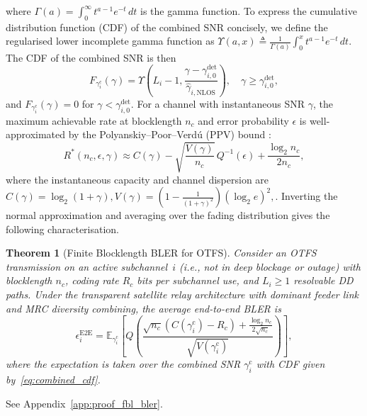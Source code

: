 \documentclass[lettersize,journal]{IEEEtran}
\newtheorem{theorem}{Theorem}
\begin{document}
where $\Gamma(a) = \int_0^{\infty} t^{a-1} e^{-t}\,dt$ is the gamma 
function. To express the cumulative distribution function (CDF) of the combined SNR concisely, we define the regularised lower incomplete gamma function as $
\Upsilon(a,x) \triangleq \frac{1}{\Gamma(a)}\int_0^x t^{a-1} e^{-t} \, dt.
$ The CDF of the combined SNR is then
\begin{equation}
F_{\gamma_i^{\mathrm{c}}}(\gamma) = \Upsilon\left(L_i-1, \frac{\gamma - \gamma_{i,0}^{\mathrm{det}}}{\hat{\gamma}_{i,\mathrm{NLOS}}}\right), \quad \gamma \geq \gamma_{i,0}^{\mathrm{det}},
\label{eq:combined_cdf}
\end{equation}
and $F_{\gamma_i^{\mathrm{c}}}(\gamma) = 0$ for $\gamma < \gamma_{i,0}^{\mathrm{det}}$. For a channel with instantaneous SNR $\gamma$, the maximum achievable rate at blocklength $n_c$ and error probability $\epsilon$ is well-approximated by the Polyanskiy--Poor--Verd\'{u} (PPV) bound \cite{7303958,Yang2014}:
\begin{equation}
R^*(n_c, \epsilon, \gamma) \approx C(\gamma) - \sqrt{\frac{V(\gamma)}{n_c}}\, Q^{-1}(\epsilon) + \frac{\log_2 n_c}{2 n_c},
\label{eq:normal_approx}
\end{equation}
where the instantaneous capacity and channel dispersion are
$ C(\gamma) = \log_2(1 + \gamma),  V(\gamma) = \left(1 - \frac{1}{(1+\gamma)^2}\right)(\log_2 e)^2, $. Inverting the normal approximation and averaging over the fading distribution gives the following characterisation.

\begin{theorem}[Finite Blocklength BLER for OTFS]
\label{thm:fbl_bler}
Consider an OTFS transmission on an active subchannel~$i$ (i.e., not in deep 
blockage or outage) with blocklength $n_c$, 
coding rate $R_c$ bits per subchannel use, and $L_i \geq 1$ resolvable 
DD paths. Under the transparent satellite relay architecture with 
dominant feeder link and MRC diversity combining, the average end-to-end BLER is
\begin{equation}
\epsilon_i^{\mathrm{E2E}} = \mathbb{E}_{\gamma_i^{\mathrm{c}}}\left[Q\left(\frac{\sqrt{n_c}\left(C(\gamma_i^{\mathrm{c}}) - R_c\right) + \frac{\log_2 n_c}{2\sqrt{n_c}}}{\sqrt{V(\gamma_i^{\mathrm{c}})}}\right)\right],
\label{eq:bler_exact}
\end{equation}
where the expectation is taken over the combined SNR $\gamma_i^{\mathrm{c}}$ with CDF given by~\eqref{eq:combined_cdf}.
\end{theorem}

\begin{IEEEproof}
See Appendix~\ref{app:proof_fbl_bler}.
\end{IEEEproof}
\end{document}

